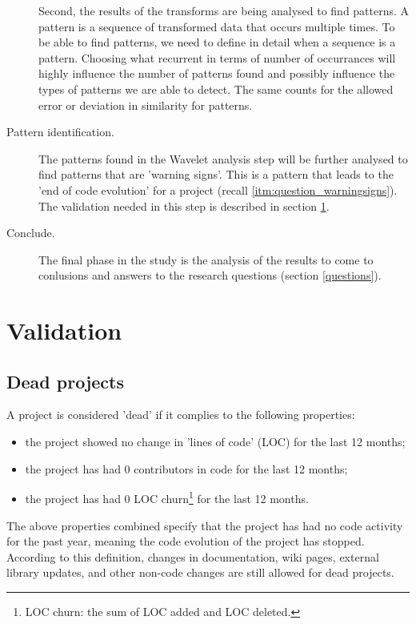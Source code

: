 \begin{description}
	Second, the results of the transforms are being analysed to find patterns. A
	pattern is a sequence of transformed data that occurs multiple times. To be
	able to find patterns, we need to define in detail when a sequence is a
	pattern. Choosing what recurrent in terms of number of occurrances will highly
	influence the number of patterns found and possibly influence the types
	of patterns we are able to detect. The same counts for the allowed error or
	deviation in similarity for patterns.
	
	\item[Pattern identification.] The patterns found in the Wavelet analysis step
	will be further analysed to find patterns that are 'warning signs'. This is a
	pattern that leads to the 'end of code evolution' for a project (recall
	\ref{itm:question_warningsigns}). The validation needed in this step is
	described in section \ref{method:validation}.
	
	\item[Conclude.] The final phase in the study is the analysis of the results to
	come to conlusions and answers to the research questions (section
	\ref{questions}).
\end{description}

\section{Validation}
\label{method:validation}
\subsection{Dead projects}
\label{def:dead}
A project is considered 'dead' if it complies to the following properties:
\begin{itemize}
	\item the project showed no change in 'lines of code' (LOC) for the last 12
	months;
	\item the project has had 0 contributors in code for the last 12 months;
	\item the project has had 0 LOC churn\footnote{LOC churn: the sum of LOC added
	and LOC deleted.} for the last 12 months.
\end{itemize}

\noindent
The above properties combined specify that the project has had no code activity
for the past year, meaning the code evolution of the project has stopped.
According to this definition, changes in documentation, wiki pages, external
library updates, and other non-code changes are still allowed for dead
projects.

